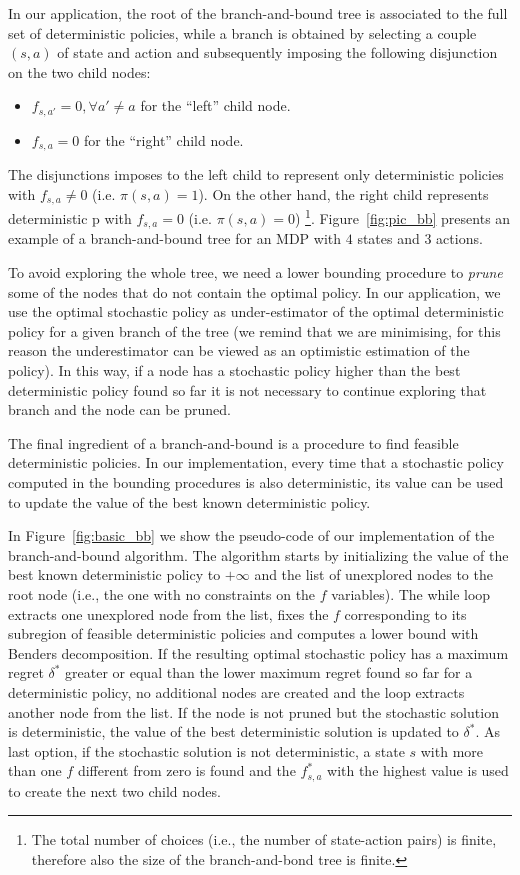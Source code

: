 \documentclass[sigconf]{aamas}  %
\begin{document}
In our application, the root of the branch-and-bound tree is associated to the full set of deterministic policies, while a branch is obtained by selecting a couple $(s,a)$ of state and action and subsequently imposing the following disjunction on the two child nodes:
\begin{itemize}
\item $f_{s,a'}=0, \forall a'\neq a$ for the ``left'' child node.
\item $f_{s,a}=0$ for the ``right'' child node. 
\end{itemize} 
The disjunctions imposes to the left child to represent only deterministic policies with $f_{s,a}\neq 0$  (i.e. $\pi(s,a)=1$). On the other hand, the right child represents deterministic p with $f_{s,a}=0$  (i.e. $\pi(s,a)=0$)
\footnote{The total number of choices (i.e., the number of state-action pairs) is finite, therefore also the size of the branch-and-bond tree is finite.}. Figure~\ref{fig:pic_bb} presents an example of a branch-and-bound tree for an MDP with $4$ states and $3$ actions. 
 

To avoid exploring the whole tree, we need a lower bounding procedure to \textit{prune} some of the nodes that do not contain the optimal policy. In our application, we use the optimal stochastic policy as under-estimator of the optimal deterministic policy for a given branch of the tree (we remind that we are minimising, for this reason the underestimator can be viewed as an optimistic estimation of the policy). In this way, if a node has a stochastic policy higher than the best deterministic policy found so far it is not necessary to continue exploring that branch and the node can be pruned.

The final ingredient of a branch-and-bound is a procedure to find feasible deterministic policies. In our implementation, every time that a stochastic policy computed in the bounding procedures is also deterministic, its value can be used to update the value of the best known deterministic policy. %


In Figure~\ref{fig:basic_bb} we show the pseudo-code of our implementation of the branch-and-bound algorithm. The algorithm starts by initializing the value of the best known deterministic policy to $+\infty$ and the list of unexplored nodes to the root node (i.e., the one with no constraints on the $f$ variables).
The while loop extracts one unexplored node from the list, fixes the $f$ corresponding to its subregion of feasible deterministic policies and computes a lower bound with Benders decomposition. If the resulting optimal stochastic policy has a maximum regret $\delta^*$ greater or equal than the lower maximum regret found so far for a deterministic policy, no additional nodes are created and the loop extracts another node from the list. If the node is not pruned but the stochastic solution is deterministic, the value of the best deterministic solution is updated to $\delta^*$. As last option, if the stochastic solution is not deterministic, a state $s$ with more than one $f$ different from zero is found and the $f^*_{s,a}$ with the highest value is used to create the next two child nodes.
\end{document}
